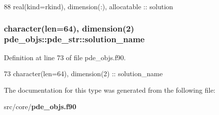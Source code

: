 \begin{DoxyCode}
88     \textcolor{keywordtype}{real(kind=rkind)}, \textcolor{keywordtype}{dimension(:)}, \textcolor{keywordtype}{allocatable}      :: solution
\end{DoxyCode}
\subsubsection[{solution\+\_\+name}]{\setlength{\rightskip}{0pt plus 5cm}character(len=64), dimension(2) pde\+\_\+objs\+::pde\+\_\+str\+::solution\+\_\+name}\label{structpde__objs_1_1pde__str_a02d097892572f63954725b150eb084ae}


Definition at line 73 of file pde\+\_\+objs.\+f90.


\begin{DoxyCode}
73     \textcolor{keywordtype}{character(len=64)}, \textcolor{keywordtype}{dimension(2)}                  :: solution\_name
\end{DoxyCode}


The documentation for this type was generated from the following file\+:\begin{DoxyCompactItemize}
\item 
src/core/{\bf pde\+\_\+objs.\+f90}\end{DoxyCompactItemize}
